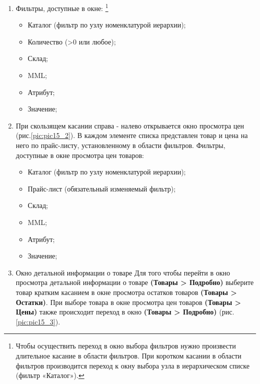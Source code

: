 \begin{enumerate}[\thesection .1]
\begin{figure}[!h]
	\begin{floatrow}
		{\texttt{[image: scr15\_1.png]}}
		{\texttt{[image: scr15\_2.png]}}         
	\end{floatrow}
\end{figure}
\item Фильтры, доступные в окне: \footnote{Чтобы осуществить переход в окно выбора фильтров нужно произвести длительное касание в области фильтров. При коротком касании в области фильтров производится переход к окну выбора узла в иерархическом списке (фильтр «Каталог»).}
\begin{itemize}
	\item Каталог (фильтр по узлу номенклатурой иерархии);
	\item Количество (>0 или любое);
	\item Склад;
	\item MML;
	\item Атрибут;
	\item Значение;	
\end{itemize}
\item При скользящем касании справа - налево открывается окно просмотра цен (рис.\ref {pic:pic15_2}). 
В каждом элементе списка представлен товар и цена на него по прайс-листу, установленному в области фильтров.
Фильтры, доступные в окне просмотра цен товаров:
\begin{itemize}
	\item Каталог (фильтр по узлу номенклатурой иерархии);
	\item Прайс-лист (обязательный изменяемый фильтр);
	\item Склад;
	\item MML;
	\item Атрибут;
	\item Значение;	
\end{itemize}
\item Окно детальной информации о товаре
Для того чтобы перейти в окно просмотра детальной информации о товаре
\textbf{(Товары > Подробно)}  выберите товар кратким касанием в окне просмотра остатков товаров \textbf{(Товары > Остатки)}. При выборе товара в окне просмотра цен товаров \textbf{(Товары > Цены)} также происходит переход в окно \textbf{(Товары > Подробно)}
(рис.\ref {pic:pic15_3}).
\begin{figure}[!h]
	\begin{floatrow}

\end{floatrow}
\end{figure}
\end{enumerate}
